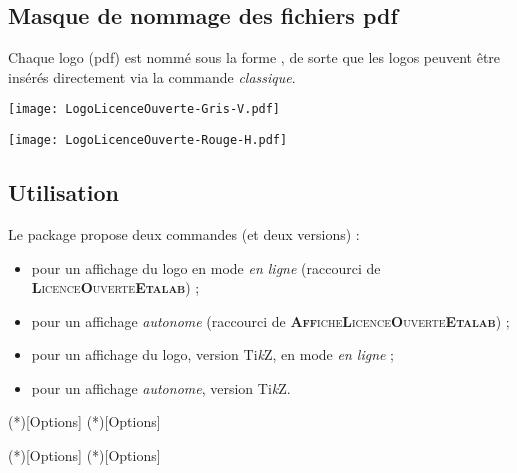 \documentclass[french,11pt,a4paper]{article}
\providecommand\tikzlogo{Ti\textit{k}Z}
\let\TikZ\tikzlogo
\begin{document}
\begin{codehigh}[language=latex/latex2,style/main=cyan!10,style/code=cyan!10]
\usepackage{logoetalab}
\end{codehigh}

\subsection{Masque de nommage des fichiers pdf}

Chaque logo (pdf) est nommé sous la forme , de sorte que les logos peuvent être insérés directement via la commande  \textit{classique}.

\begin{demohigh}[language=latex/latex3,style/main=cyan!10,style/code=cyan!10,style/demo=cyan!10]
\texttt{[image: LogoLicenceOuverte-Gris-V.pdf]}\par
\texttt{[image: LogoLicenceOuverte-Rouge-H.pdf]}
\end{demohigh}

\subsection{Utilisation}

Le package propose deux commandes (et deux versions) :

\medskip

\begin{itemize}
	\item {} pour un affichage du logo en mode \textit{en ligne} (raccourci de \textsc{\textbf{L}icence\textbf{O}uverte\textbf{Etalab}}) ;
	\item {} pour un affichage \textit{autonome} (raccourci de \textsc{\textbf{Aff}iche\textbf{L}icence\textbf{O}uverte\textbf{Etalab}}) ;
	\item {} pour un affichage du logo, version \TikZ, en mode \textit{en ligne} ;
	\item {} pour un affichage \textit{autonome}, version \TikZ.
\end{itemize}

\medskip

\begin{codehigh}[language=latex/latex2,style/main=cyan!10,style/code=cyan!10]
\loetalab(*)[Options]
\affloetalab(*)[Options]

\loetalabtkz(*)[Options]
\affloetalabtkz(*)[Options]
\end{codehigh}
\end{document}
